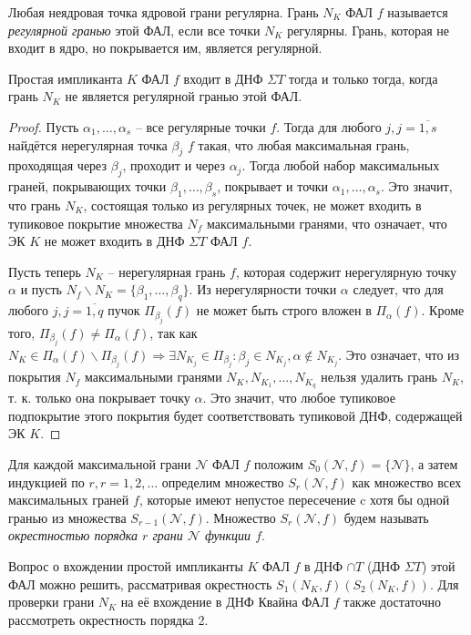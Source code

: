 \documentclass[11pt]{article}
\newcounter{th}\setcounter{th}{0}
\def\th{\par\smallskip\refstepcounter{th}\textbf{\arabic{th}}}
\newtheorem*{Theorem}{Теорема \th}
\begin{document}
Любая неядровая точка ядровой грани регулярна. Грань \(N_K\) ФАЛ \(f\) называется \emph{регулярной гранью} этой ФАЛ, если все точки \(N_K\) регулярны. Грань, которая не входит в ядро, но покрывается им, является регулярной.
  \begin{Theorem}
Простая импликанта $K$ ФАЛ $f$ входит в ДНФ $\Sigma T$ тогда и только тогда, когда грань $N_K$ не является регулярной гранью этой ФАЛ.
  \end{Theorem}
\begin{proof}
Пусть $\alpha_1, \ldots, \alpha_s$ -- все регулярные точки $f$. Тогда для любого $j, j = \overline{1, s}$ найдётся нерегулярная точка $\beta_j$ $f$ такая, что любая максимальная грань, проходящая через $\beta_j$, проходит и через $\alpha_j$. Тогда любой набор максимальных граней, покрывающих точки $\beta_1, \ldots, \beta_s$, покрывает и точки $\alpha_1, \ldots, \alpha_s$. Это значит, что грань $N_K$, состоящая только из регулярных точек, не может входить в тупиковое покрытие множества $N_f$ максимальными гранями, что означает, что ЭК $K$ не может входить в ДНФ $\Sigma T$ ФАЛ $f$.

Пусть теперь $N_K$ -- нерегулярная грань $f$, которая содержит нерегулярную точку $\alpha$ и пусть $N_f \backslash N_K = \{\beta_1, \ldots, \beta_q\}$. Из нерегулярности точки $\alpha$ следует, что для любого $j, j = \overline{1, q}$ пучок $\Pi_{\beta_j}(f)$ не может быть строго вложен в $\Pi_{\alpha}(f)$. Кроме того, $\Pi_{\beta_j}(f) \neq \Pi_{\alpha}(f)$, так как $N_K \in \Pi_{\alpha}(f) \backslash \Pi_{\beta_j}(f) \Rightarrow \exists N_{K_j} \in \Pi_{\beta_j}: \beta_j \in N_{K_j}, \alpha \notin N_{K_j}$. Это означает, что из покрытия $N_f$ максимальными гранями $N_K, N_{K_1}, \ldots, N_{K_q}$ нельзя удалить грань $N_K$, т. к. только она покрывает точку $\alpha$. Это значит, что любое тупиковое подпокрытие этого покрытия будет соответствовать тупиковой ДНФ, содержащей ЭК $K$.
\end{proof}

Для каждой максимальной грани \(\mathcal{N}\) ФАЛ \(f\) положим \(S_0(\mathcal{N}, f) = \{\mathcal{N}\}\), а затем индукцией по \(r, r = 1, 2, \ldots\) определим множество \(S_r(\mathcal{N}, f)\) как множество всех максимальных граней \(f\), которые имеют непустое пересечение c хотя бы одной гранью из множества \(S_{r - 1}(\mathcal{N}, f)\). Множество \(S_r(\mathcal{N}, f)\) будем называть \emph{окрестностью порядка \(r\) грани \(\mathcal{N}\) функции \(f\)}.

Вопрос о вхождении простой импликанты \(K\) ФАЛ \(f\) в ДНФ \(\cap T\) (ДНФ \(\Sigma T\)) этой ФАЛ можно решить, рассматривая окрестность \(S_1(N_K, f)(S_2(N_K, f))\). Для проверки грани \(N_K\) на её вхождение в ДНФ Квайна ФАЛ \(f\) также достаточно рассмотреть окрестность порядка 2.
\end{document}
